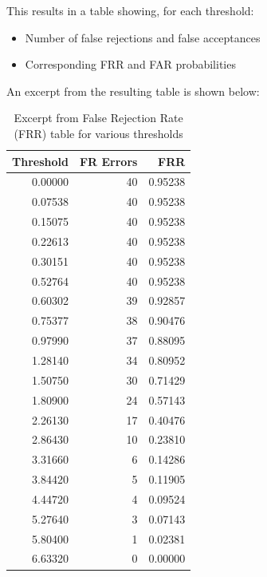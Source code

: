\documentclass[a4paper,12pt]{article}
\begin{document}
\vspace{0.5em}
\noindent
This results in a table showing, for each threshold:
\begin{itemize}[noitemsep]
    \item Number of false rejections and false acceptances
    \item Corresponding FRR and FAR probabilities
\end{itemize}

\vspace{0.5em}
\noindent
An excerpt from the resulting table is shown below:

\vspace{1em}
\begin{table}[H]
\centering
\begin{tabular}{@{}rrr@{}}
\toprule
\textbf{Threshold} & \textbf{FR Errors} & \textbf{FRR} \\
\midrule
0.00000  & 40 & 0.95238 \\
0.07538  & 40 & 0.95238 \\
0.15075  & 40 & 0.95238 \\
0.22613  & 40 & 0.95238 \\
0.30151  & 40 & 0.95238 \\
0.52764  & 40 & 0.95238 \\
0.60302  & 39 & 0.92857 \\
0.75377  & 38 & 0.90476 \\
0.97990  & 37 & 0.88095 \\
1.28140  & 34 & 0.80952 \\
1.50750  & 30 & 0.71429 \\
1.80900  & 24 & 0.57143 \\
2.26130  & 17 & 0.40476 \\
2.86430  & 10 & 0.23810 \\
3.31660  &  6 & 0.14286 \\
3.84420  &  5 & 0.11905 \\
4.44720  &  4 & 0.09524 \\
5.27640  &  3 & 0.07143 \\
5.80400  &  1 & 0.02381 \\
6.63320  &  0 & 0.00000 \\
\bottomrule
\end{tabular}
\caption{Excerpt from False Rejection Rate (FRR) table for various thresholds}
\label{tab:frr_table}
\end{table}
\end{document}
